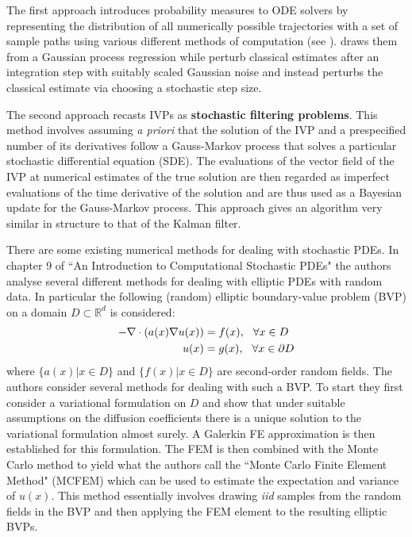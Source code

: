 The first approach introduces probability measures to ODE solvers by representing the distribution of all numerically possible trajectories with a set of sample paths using various different methods of computation (see \textcolor{blue}{\citep{chkrebtii2016bayesian,conrad2017statistical,teymur2016probabilistic,lie2019strong,abdulle2020random,teymur2018implicit}}). \textcolor{blue}{\citep{chkrebtii2016bayesian}} draws them from a Gaussian process regression while \textcolor{blue}{\citep{conrad2017statistical,teymur2016probabilistic,lie2019strong,teymur2018implicit}} perturb classical estimates after an integration step with suitably scaled Gaussian noise and \textcolor{blue}{\citep{abdulle2020random}} instead perturbs the classical estimate via choosing a stochastic step size.

The second approach \textcolor{blue}{\citep{schober2014probabilistic,kersting2016active,magnani2017bayesian,schober2019probabilistic,tronarp2019probabilistic,kersting2018convergence}} recasts IVPs as \textbf{stochastic filtering problems}. This method involves assuming \textit{a priori} that the solution of the IVP and a prespecified number of its derivatives follow a Gauss-Markov process that solves a particular stochastic differential equation (SDE). The evaluations of the vector field of the IVP at numerical estimates of the true solution are then regarded as imperfect evaluations of the time derivative of the solution and are thus used as a Bayesian update for the Gauss-Markov process. This approach gives an algorithm very similar in structure to that of the Kalman filter.

There are some existing numerical methods for dealing with stochastic PDEs. In chapter 9 of ``An Introduction to Computational Stochastic PDEs" \textcolor{blue}{\citep{lord2014introduction}} the authors analyse several different methods for dealing with elliptic PDEs with random data. In particular the following (random) elliptic boundary-value problem (BVP) on a domain $D\subset\mathbb{R}^d$ is considered:
\begin{align*}
-\nabla \cdot(a(x) \nabla u(x)) &=f(x), \hspace{0.25cm} \forall x \in D \\
u(x) &=g(x), \hspace{0.25cm} \forall x \in \partial D
\end{align*}
where $\{a(x)|x\in D\}$ and $\{f(x)|x\in D\}$ are second-order random fields. The authors consider several methods for dealing with such a BVP. To start they first consider a variational formulation on $D$ and show that under suitable assumptions on the diffusion coefficients there is a unique solution to the variational formulation almost surely. A Galerkin FE approximation is then established for this formulation.
The FEM is then combined with the Monte Carlo method to yield what the authors call the ``Monte Carlo Finite Element Method" (MCFEM) which can be used to estimate the expectation and variance of $u(x)$. This method essentially involves drawing \textit{iid} samples from the random fields in the BVP and then applying the FEM element to the resulting elliptic BVPs.

